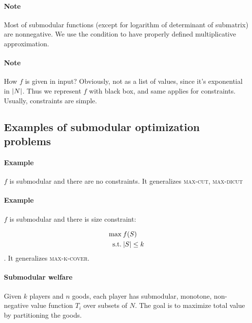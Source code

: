 \paragraph{Note} Most of submodular functions (except for logarithm of determinant of submatrix) are nonnegative. We use the condition to have properly defined multiplicative approximation.
\paragraph{Note} How $f$ is given in input? Obviously, not as a list of values, since it's exponential in $\abs{N}$. Thus we represent $f$ with black box, and same applies for constraints. Usually, constraints are simple. 

\subsection{Examples of submodular optimization problems}
\paragraph{Example}
$f$ is submodular and there are no constraints. It generalizes \textsc{max-cut}, \textsc{max-dicut}
\paragraph{Example}
$f$ is submodular and there is size constraint:

\begin{align}
\max \: & f(S)\\
\text{s.t.} \: & \abs{S} \leq k
\end{align}
. It generalizes \textsc{max-k-cover}.

\paragraph{Submodular welfare}
Given $k$ players and $n$ goods, each player has submodular, monotone, non-negative value function $T_i$ over subsets of $N$. The goal is to maximize total value by partitioning the goods.